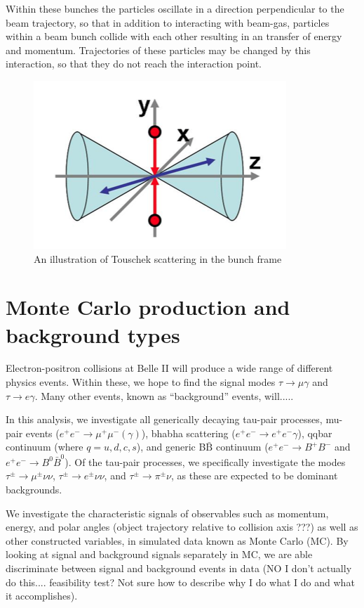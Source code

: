\documentclass[12pt]{thesis}  %
\begin{document}
Within these bunches the particles oscillate in a direction perpendicular to the beam trajectory, so that in addition to interacting with beam-gas, particles within a beam bunch collide with each other resulting in an transfer of energy and momentum. Trajectories of these particles may be changed by this interaction, so that they do not reach the interaction point. 

\begin{figure}[h]
\centering
\includegraphics[width=0.5\linewidth]{images/touschek-beam-frame.png}
\caption{An illustration of Touschek scattering in the bunch frame}
\label{fig:test2}
\end{figure}



\pagebreak

\chapter{Monte Carlo production and background types}

Electron-positron collisions at Belle II will produce a wide range of different physics events. Within these, we hope to find the signal modes $\tau\to\mu\gamma$ and $\tau\to e\gamma$. Many other events, known as ``background'' events, will.....

In this analysis, we investigate all generically decaying tau-pair processes, mu-pair events ($e^+ e^- \to \mu^+ \mu^- (\gamma)$), bhabha scattering ($e^+ e^- \to e^+ e^- \gamma$), qqbar continuum (where $q = u, d, c, s$), and generic B$\bar{\text{B}}$ continuum ($e^+ e^- \to B^+ B^-$ and $e^+ e^- \to B^0 \bar{B}^0$). Of the tau-pair processes, we specifically investigate the modes $\tau^{\pm} \to \mu^{\pm} \nu \nu$, $\tau^{\pm} \to e^{\pm} \nu \nu$, and $\tau^{\pm} \to \pi^{\pm} \nu$, as these are expected to be dominant backgrounds.

We investigate the characteristic signals of observables such as momentum, energy, and polar angles (object trajectory relative to collision axis ???) as well as other constructed variables, in simulated data known as Monte Carlo (MC). By looking at signal and background signals separately in MC, we are able discriminate between signal and background events in data (NO I don't actually do this.... feasibility test? Not sure how to describe why I do what I do and what it accomplishes).
\end{document}
